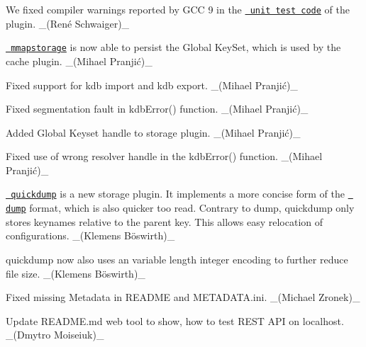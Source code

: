 \begin{DoxyItemize}
\item We fixed compiler warnings reported by G\+CC 9 in the \href{/home/mpranj/workspace/libelektra/src/plugins/mini/testmod_mini.c}{\texttt{ unit test code}} of the plugin. \+\_\+(René Schwaiger)\+\_\+
\end{DoxyItemize}


\begin{DoxyItemize}
\item \href{https://www.libelektra.org/plugins/mmapstorage}{\texttt{ mmapstorage}} is now able to persist the Global Key\+Set, which is used by the {\ttfamily cache} plugin. \+\_\+(Mihael Pranjić)\+\_\+
\item Fixed support for {\ttfamily kdb import} and {\ttfamily kdb export}. \+\_\+(Mihael Pranjić)\+\_\+
\end{DoxyItemize}


\begin{DoxyItemize}
\item Fixed segmentation fault in {\ttfamily kdb\+Error()} function. \+\_\+(Mihael Pranjić)\+\_\+
\item Added Global Keyset handle to storage plugin. \+\_\+(Mihael Pranjić)\+\_\+
\item Fixed use of wrong resolver handle in the {\ttfamily kdb\+Error()} function. \+\_\+(Mihael Pranjić)\+\_\+
\end{DoxyItemize}


\begin{DoxyItemize}
\item \href{https://www.libelektra.org/plugins/quickdump}{\texttt{ quickdump}} is a new storage plugin. It implements a more concise form of the \href{https://www.libelektra.org/plugins/dump}{\texttt{ dump}} format, which is also quicker too read. Contrary to dump, quickdump only stores keynames relative to the parent key. This allows easy relocation of configurations. \+\_\+(Klemens Böswirth)\+\_\+
\item quickdump now also uses an variable length integer encoding to further reduce file size. \+\_\+(Klemens Böswirth)\+\_\+
\end{DoxyItemize}


\begin{DoxyItemize}
\item Fixed missing Metadata in R\+E\+A\+D\+ME and M\+E\+T\+A\+D\+A\+T\+A.\+ini. \+\_\+(\+Michael Zronek)\+\_\+
\item Update R\+E\+A\+D\+M\+E.\+md web tool to show, how to test R\+E\+ST A\+PI on localhost. \+\_\+(\+Dmytro Moiseiuk)\+\_\+
\end{DoxyItemize}


